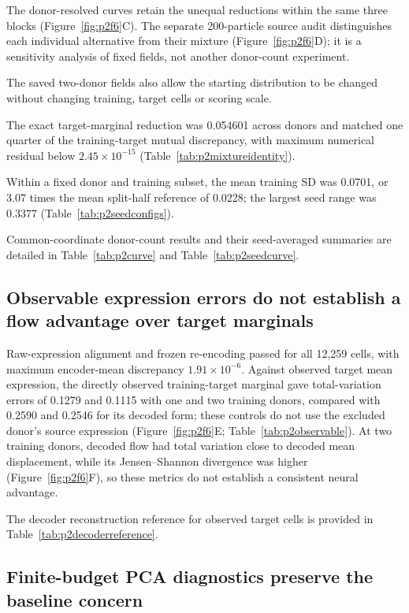 \documentclass[10pt,a4paper]{article}
\begin{document}
The donor-resolved curves retain the unequal reductions within the same three blocks (Figure~\ref{fig:p2f6}C). The separate 200-particle source audit distinguishes each individual alternative from their mixture (Figure~\ref{fig:p2f6}D); it is a sensitivity analysis of fixed fields, not another donor-count experiment.

The saved two-donor fields also allow the starting distribution to be changed without changing training, target cells or scoring scale.

The exact target-marginal reduction was 0.054601 across donors and matched one quarter of the training-target mutual discrepancy, with maximum numerical residual below $2.45\times10^{-15}$ (Table~\ref{tab:p2mixtureidentity}).

Within a fixed donor and training subset, the mean training SD was 0.0701, or 3.07 times the mean split-half reference of 0.0228; the largest seed range was 0.3377 (Table~\ref{tab:p2seedconfigs}).

Common-coordinate donor-count results and their seed-averaged summaries are detailed in Table~\ref{tab:p2curve} and Table~\ref{tab:p2seedcurve}.

\subsection{Observable expression errors do not establish a flow advantage over target marginals}

Raw-expression alignment and frozen re-encoding passed for all 12,259 cells, with maximum encoder-mean discrepancy $1.91\times10^{-6}$. Against observed target mean expression, the directly observed training-target marginal gave total-variation errors of 0.1279 and 0.1115 with one and two training donors, compared with 0.2590 and 0.2546 for its decoded form; these controls do not use the excluded donor's source expression (Figure~\ref{fig:p2f6}E; Table~\ref{tab:p2observable}). At two training donors, decoded flow had total variation close to decoded mean displacement, while its Jensen--Shannon divergence was higher (Figure~\ref{fig:p2f6}F), so these metrics do not establish a consistent neural advantage.

The decoder reconstruction reference for observed target cells is provided in Table~\ref{tab:p2decoderreference}.

\subsection{Finite-budget PCA diagnostics preserve the baseline concern}
\end{document}
